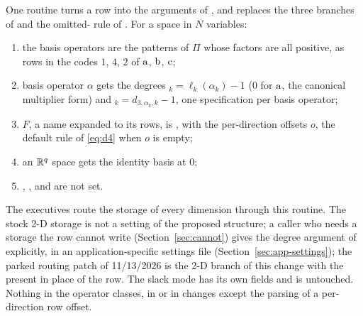 One routine turns a row into the arguments of , and replaces the three branches of  and the omitted- rule of . For a space in $N$ variables:
\begin{enumerate}\setlength\itemsep{0pt}
\item the basis operators are the patterns of $\Pi$ whose factors are all positive, as  rows in the codes $1$, $4$, $2$ of $\mathrm{a}$, $\mathrm{b}$, $\mathrm{c}$;
\item basis operator $\alpha$ gets the degrees $_k=\ell_k(\alpha_k)-1$ ($0$ for $\mathrm{a}$, the canonical multiplier form) and $_k=d_{3,\alpha_k,k}-1$, one specification per basis operator;
\item $F$, a name expanded to its rows, is , with  the per-direction offsets $o$, the default rule of \eqref{eq:d4} when $o$ is empty;
\item an $\mathbb{R}^q$ space gets the identity basis at  $0$;
\item {}, ,  and  are not set.
\end{enumerate}
The executives route the storage of every dimension through this routine. The stock 2-D storage is not a setting of the proposed structure; a caller who needs a storage the row cannot write (Section~\ref{sec:cannot}) gives the degree argument of  explicitly, in an application-specific settings file (Section~\ref{sec:app-settings}); the parked routing patch of 11/13/2026 is the 2-D branch of this change with the present  in place of the row. The  slack mode has its own fields and is untouched. Nothing in the operator classes, in  or in  changes except the parsing of a per-direction row offset.

